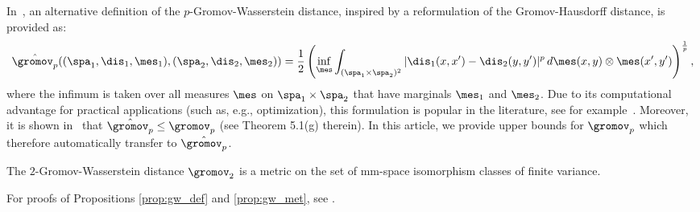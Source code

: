 In~\cite{memoli2011gromov}, an alternative definition of the $p$-Gromov-Wasserstein distance, inspired by a reformulation of the Gromov-Hausdorff distance, is provided as:
$$\Hat{\gromov_p}((\spa_1,\dis_1,\mes_1),(\spa_2,\dis_2,\mes_2))=\frac 12 \left(\inf_{\mes}\int_{(\spa_1\times \spa_2)^2} |\dis_1(x,x')-\dis_2(y,y')|^p\,d\mes(x,y)\otimes\mes(x',y')\right)^{\frac{1}{p}},$$
where the infimum is taken over all measures $\mes$ on $\spa_1\times \spa_2$ that have marginals $\mes_1$ and $\mes_2$. Due to its computational advantage for practical applications (such as, e.g., optimization), this formulation is popular in the literature, see for example~\cite{zhang2023duality,memoli2009spectral}.
Moreover, it is shown in~\cite{memoli2011gromov}  that $\Hat{\gromov_p}\leq\gromov_p$ (see Theorem 5.1(g) therein). In this article, we provide upper bounds for $\gromov_p$ which therefore automatically transfer to $\Hat{\gromov_p}$.

\begin{proposition}\label{prop:gw_met}
The $2$-Gromov-Wasserstein distance $\gromov_2$ is a metric on the set of mm-space isomorphism classes of finite variance.    
\end{proposition}

For proofs of Propositions \ref{prop:gw_def} and \ref{prop:gw_met}, see \cite{sturm2006geometry}.